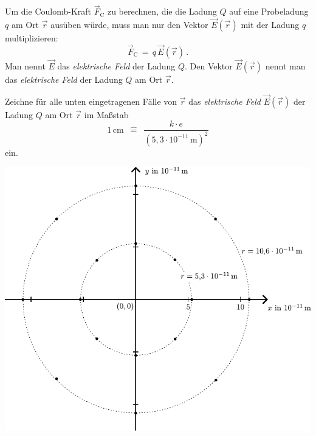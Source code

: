 \documentclass[task=1]{exercise}
\renewcommand{\vec}{\overrightarrow}
\begin{document}
    Um die Coulomb-Kraft $\vec{F}_\mathrm{C}$ zu berechnen, die die Ladung $Q$ auf eine Probeladung $q$ am Ort $\vec{r}$ aus\"uben w\"urde, muss man nur den Vektor $\vec{E}(\vec{r})$ mit der Ladung $q$ multiplizieren:
    \begin{equation}
        \vec{F}_\mathrm{C} \,=\, q \, \vec{E}(\vec{r})\, .
    \end{equation}
    Man nennt $\vec{E}$ das \emph{elektrische Feld} der Ladung $Q$. Den Vektor $\vec{E}(\vec{r})$ nennt man das \emph{elektrische Feld} der Ladung $Q$ am Ort $\vec{r}$.
    
    Zeichne f\"ur alle unten eingetragenen F\"alle von $\vec{r}$ das \emph{elektrische Feld} $\vec{E}(\vec{r})$ der Ladung $Q$ am Ort $\vec{r}$ im Ma{\ss}stab
  \begin{equation}
    1\,\mathrm{cm} \,\,\, \hat{=}\,\,\, \frac{k\cdot e}{\left( 5{,}3\cdot 10^{-11}\, \mathrm{m} \right)^2}
  \end{equation}
  ein.
  
    \begin{center}
   \includegraphics{images/diagram.pdf}
  \end{center}
\end{document}
